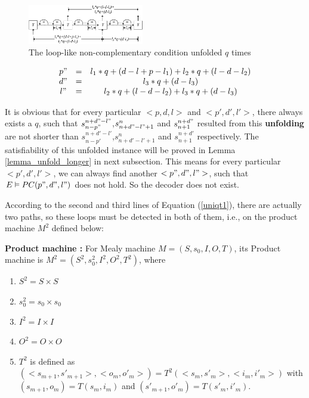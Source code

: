 \documentclass[journal]{IEEEtran}
\begin{document}
\begin{figure}[b]
\begin{center}
\includegraphics[width=0.45\textwidth]{doubleloop_unfold}
\end{center}
\caption{The loop-like non-complementary condition unfolded $q$ times}
  \label{fig_double_loop_unfold}
\end{figure}

\begin{equation}
\begin{array}{ccc}
p"&=&l_1*q+(d-l+p-l_1)+l_2*q+(l-d-l_2) \\
d"&=&l_3*q+(d-l_3) \\
l"&=&l_2*q+(l-d-l_2)+l_3*q+(d-l_3)
\end{array}
\end{equation}

It is obvious that for every particular $<p,d,l>$ and $<p',d',l'>$,
there always exists a $q$,
such that $s_{n-p"}^{n+d"-l"}$,$s_{n+d"-l"+1}^n$ and $s_{n+1}^{n+d"}$ resulted from this \textbf{unfolding}
are not shorter than $s_{n-p'}^{n+d'-l'}$,$s_{n+d'-l'+1}^n$ and $s_{n+1}^{n+d'}$ respectively.
The satisfiability of this unfolded instance will be proved in Lemma \ref{lemma_unfold_longer} in next subsection.
This means for every particular $<p',d',l'>$,
we can always find another $<p",d",l">$,
such that $E\vDash PC(p",d",l")$ does not hold.
So the decoder does not exist.



According to the second and third lines of Equation (\ref{uniqt1}),
there are actually two paths,
so these loops must be detected in both of them,
i.e.,
on the product machine $M^2$ defined below:

\begin{definition11}%
\textbf{Product machine :}
For Mealy machine $M=(S,s_0,I,O,T)$,
its Product machine is $M^2=(S^2,s_0^2,I^2,O^2,T^2)$,
where
\begin{enumerate}
  \item $S^2=S\times S$
  \item $s_0^2=s_0\times s_0$
  \item $I^2=I\times I$
  \item $O^2=O\times O$
  \item $T^2$ is defined as $(<s_{m+1},s'_{m+1}>,<o_m,o'_m>)=T^2(<s_m,s'_m>,<i_m,i'_m>)$ with $(s_{m+1},o_m)=T(s_m,i_m)$ and $(s'_{m+1},o'_m)=T(s'_m,i'_m)$.
\end{enumerate}
\end{definition11}
\end{document}

